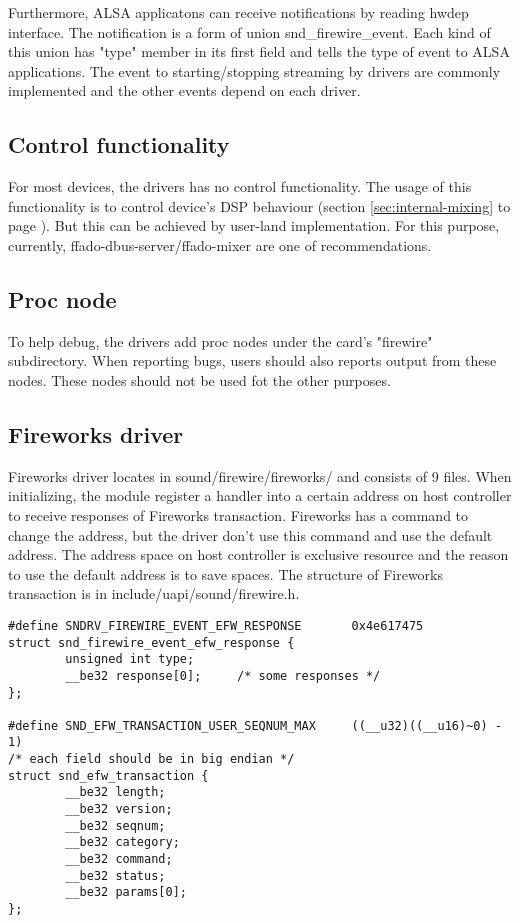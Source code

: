 \documentclass[onecolumn]{article}
\begin{document}
Furthermore, ALSA applicatons can receive notifications by reading hwdep interface. The notification is a form of union snd\_firewire\_event. Each kind of this union has "type" member in its first field and tells the type of event to ALSA applications. The event to starting/stopping streaming by drivers are commonly implemented and the other events depend on each driver.

\subsection{Control functionality}
For most devices, the drivers has no control functionality. The usage of this functionality is to control device's DSP behaviour (section \ref{sec:internal-mixing} to page \pageref{sec:internal-mixing}). But this can be achieved by user-land implementation. For this purpose, currently, ffado-dbus-server/ffado-mixer are one of recommendations.

\subsection{Proc node}

To help debug, the drivers add proc nodes under the card's "firewire" subdirectory. When reporting bugs, users should also reports output from these nodes. These nodes should not be used fot the other purposes.


\subsection{Fireworks driver}

Fireworks driver locates in sound/firewire/fireworks/ and consists of 9 files. When initializing, the module register a handler into a certain address on host controller to receive responses of Fireworks transaction. Fireworks has a command to change the address, but the driver don't use this command and use the default address. The address space on host controller is exclusive resource and the reason to use the default address is to save spaces. The structure of Fireworks transaction is in include/uapi/sound/firewire.h.

\begin{verbatim}
#define SNDRV_FIREWIRE_EVENT_EFW_RESPONSE       0x4e617475
struct snd_firewire_event_efw_response {
        unsigned int type;
        __be32 response[0];     /* some responses */
};

#define SND_EFW_TRANSACTION_USER_SEQNUM_MAX     ((__u32)((__u16)~0) - 1)
/* each field should be in big endian */
struct snd_efw_transaction {
        __be32 length;
        __be32 version;
        __be32 seqnum;
        __be32 category;
        __be32 command;
        __be32 status;
        __be32 params[0];
};
\end{verbatim}
\end{document}
